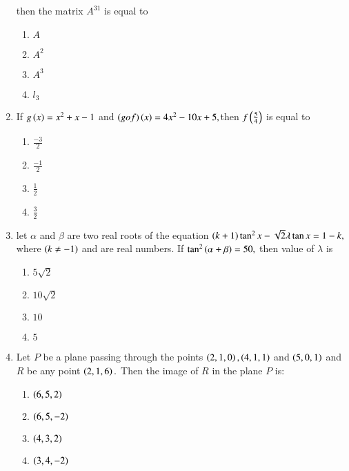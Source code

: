 \documentclass[journal,12pt,twocolumn]{IEEEtran}
\theoremstyle{remark}
\begin{document}
\begin{enumerate}
    then the matrix $A^{31}$ is equal to
    \begin{enumerate}
        \item $A$
        \item $A^2$
        \item $A^3$
        \item $l_3$\\
    \end{enumerate}
    \item If $g\left(x\right)=x^2+x-1$ and $\left(gof\right)\left(x\right)=4x^2-10x+5,$then $f\left(\frac{5}{4}\right)$ is equal to
    \begin{enumerate}
        \item $\frac{-3}{2}$
        \item $\frac{-1}{2}$
        \item $\frac{1}{2}$
        \item $\frac{3}{2}$\\
    \end{enumerate}
    \item let $\alpha$ and $\beta$ are two real roots of the equation $\left(k+1\right)\tan^2{x}-\sqrt{2}\lambda\tan{x}=1-k,$ where $\left(k\neq-1\right)$ and are real numbers. If $\tan^2\left(\alpha+\beta\right)=50,$ then value of $\lambda$ is 
    \begin{enumerate}
        \item $5\sqrt{2}$
        \item $10\sqrt{2}$
        \item $10$
        \item $5$\\
    \end{enumerate}
    \item  Let $P$ be a plane passing through the points $\left(2, 1, 0\right), \left(4, 1, 1\right)$ and $\left(5, 0, 1\right)$ and $R$ be any point $\left(2, 1, 6\right).$ Then the image of $R$ in the plane $P$ is:
    \begin{enumerate}
        \item $\left(6,5,2\right)$
        \item $\left(6,5,-2\right)$
        \item $\left(4,3,2\right)$
        \item $\left(3,4,-2\right)$\\
    \end{enumerate}
\end{enumerate}
\end{document}
